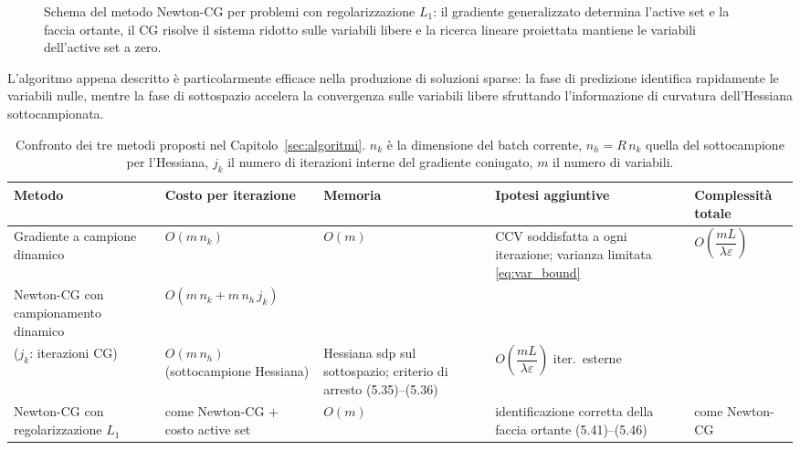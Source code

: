 \documentclass[a4paper,12pt]{article}
\numberwithin{equation}{section}
\numberwithin{figure}{section}
\numberwithin{table}{section}
\begin{document}
\begin{figure}[h]
{}
\caption{Schema del metodo Newton-CG per problemi con regolarizzazione $L_1$:
il gradiente generalizzato determina l'active set e la faccia ortante, il CG
risolve il sistema ridotto sulle variabili libere e la ricerca lineare
proiettata mantiene le variabili dell'active set a zero.}
\label{fig:newton_l1}
\end{figure}

\begin{notebox}
  L'algoritmo appena descritto è particolarmente efficace nella produzione di
  soluzioni sparse: la fase di predizione identifica rapidamente le variabili
  nulle, mentre la fase di sottospazio accelera la convergenza sulle variabili
  libere sfruttando l'informazione di curvatura dell'Hessiana sottocampionata.
\end{notebox}
\begin{table}[h]
\centering
\small
\renewcommand{\arraystretch}{1.35}
\setlength{\tabcolsep}{4pt}
\begin{tabular}{p{2.4cm} p{3.1cm} p{2.6cm} p{2.9cm} p{3.0cm}}
\toprule
\textbf{Metodo} & \textbf{Costo per iterazione} & \textbf{Memoria}
& \textbf{Ipotesi aggiuntive} & \textbf{Complessit\`a totale} \\
\midrule
Gradiente a campione dinamico &
$O(m\,n_k)$ &
$O(m)$ &
CCV soddisfatta a ogni iterazione; varianza limitata \eqref{eq:var_bound} &
$O\!\left(\dfrac{mL}{\lambda\varepsilon}\right)$ \\
Newton-CG con campionamento dinamico &
$O(m\,n_k + m\,n_h\,j_k)$\\($j_k$: iterazioni CG) &
$O(m\,n_h)$ (sottocampione Hessiana) &
Hessiana sdp sul sottospazio; criterio di arresto (5.35)--(5.36) &
$O\!\left(\dfrac{mL}{\lambda\varepsilon}\right)$ iter.\ esterne \\
Newton-CG con regolarizzazione $L_1$ &
come Newton-CG + costo active set &
$O(m)$ &
identificazione corretta della faccia ortante (5.41)--(5.46) &
come Newton-CG \\
\bottomrule
\end{tabular}
\caption{Confronto dei tre metodi proposti nel Capitolo~\ref{sec:algoritmi}.
$n_k$ \`e la dimensione del batch corrente, $n_h = R\,n_k$ quella del
sottocampione per l'Hessiana, $j_k$ il numero di iterazioni interne del
gradiente coniugato, $m$ il numero di variabili.}
\label{tab:5_1}
\end{table}
\end{document}
